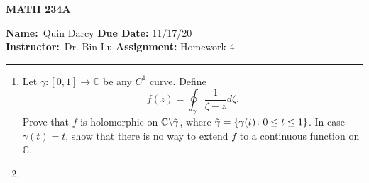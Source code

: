 \documentclass[12pt]{article}
\makeatletter
\theoremstyle{definition}
\theoremstyle{remark}
\renewenvironment{proof}[1][\proofname]{\par
  \pushQED{\qed}%
  \normalfont \topsep6\p@\@plus6\p@\relax
  \list{}{\leftmargin=0mm
          \rightmargin=4mm
          \settowidth{\itemindent}{\itshape#1}%
          \labelwidth=\itemindent
          \parsep=0pt \listparindent=\parindent 
  }
  \item[\hskip\labelsep
        \itshape
    #1\@addpunct{.}]\ignorespaces
}{%
  \popQED\endlist\@endpefalse
}
\let\oldproofname=\proofname
\renewcommand{\proofname}{\bf{\textit{\oldproofname}}}
\makeatother
\begin{document}
\thispagestyle{empty}\hline

\begin{center}
	\vspace{.4cm} {\textbf { \large MATH 234A}}
\end{center}
{\textbf{Name:}\ Quin Darcy \hspace{\fill} \textbf{Due Date:} 11/17/20   \\
{ \textbf{Instructor:}}\ Dr. Bin Lu \hspace{\fill} \textbf{Assignment:} Homework 4 \\ \hrule}

\justifying
    \begin{enumerate}[leftmargin=*]
        \item Let $\gamma\colon[0,1]\rightarrow\mathbb{C}$ be any $C^1$ curve. Define
            \begin{equation*}
                f(z)=\oint_{\gamma}\frac{1}{\zeta-z}d\zeta.
            \end{equation*}
            Prove that $f$ is holomorphic on $\mathbb{C}\backslash\Tilde{\gamma}$, where $\Tilde{\gamma}=\{\gamma(t)\colon0\leq t\leq 1\}$. In case $\gamma(t)=t$, show that there is no way to extend $f$ to a continuous function on $\mathbb{C}$.
                \begin{proof}
                    

\end{proof}
\end{enumerate}
\end{document}
